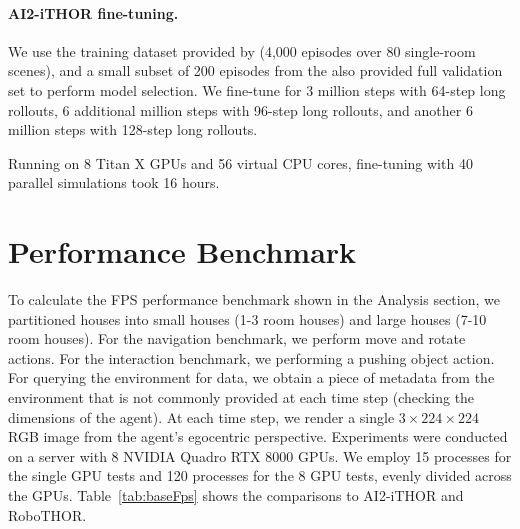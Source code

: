 \paragraph{AI2-iTHOR fine-tuning.} We use the training dataset provided by \cite{roomr-challenge} (4,000 episodes over 80 single-room scenes), and a small subset of 200 episodes from the also provided full validation set to perform model selection. We fine-tune for 3 million steps with 64-step long rollouts, 6 additional million steps with 96-step long rollouts, and another 6 million steps with 128-step long rollouts.

Running on 8 Titan X GPUs and 56 virtual CPU cores, fine-tuning with 40 parallel simulations took 16 hours.

\section{Performance Benchmark}

To calculate the FPS performance benchmark shown in the Analysis section, we partitioned houses into small houses (1-3 room houses) and large houses (7-10 room houses). For the navigation benchmark, we perform move and rotate actions. For the interaction benchmark, we performing a pushing object action. For querying the environment for data, we obtain a piece of metadata from the environment that is not commonly provided at each time step (\eg checking the dimensions of the agent). At each time step, we render a single $3\times224\times224$ RGB image from the agent's egocentric perspective. Experiments were conducted on a server with 8 NVIDIA Quadro RTX 8000 GPUs. We employ 15 processes for the single GPU tests and 120 processes for the 8 GPU tests, evenly divided across the GPUs. Table~\ref{tab:baseFps} shows the comparisons to AI2-iTHOR and RoboTHOR.

